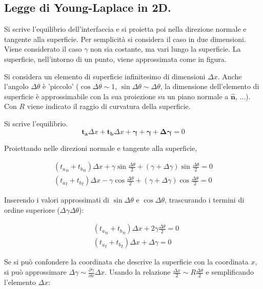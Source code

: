\subsection{Legge di Young-Laplace in 2D.}
 Si scrive l'equilibrio
 dell'interfaccia e si proietta poi nella direzione normale e tangente alla superficie.
Per semplicità si considera il caso in due dimensioni. Viene considerato il caso $\gamma$
non sia costante, ma vari lungo la superficie. La superficie, nell'intorno di un punto,
 viene approssimata come in figura.

Si considera un elemento di superficie infinitesimo di dimensioni $\Delta x$. Anche 
l'angolo $\Delta \theta$ è 'piccolo' ($\cos \Delta \theta \sim 1$, $\sin \Delta\theta \sim 
\Delta\theta$, la dimensione dell'elemento di superficie è approssimabile con la sua proiezione su 
un piano normale a $\bm{\hat{n}}$, ...). Con $R$ viene indicato il raggio di curvatura della
superficie.

Si scrive l'equilibrio.
\begin{equation}
  \bm{t_a} \Delta x + \bm{t_b} \Delta x + \bm{\gamma} + \bm{\gamma + \Delta \gamma} = 0
\end{equation}

Proiettando nelle direzioni normale e tangente alla superficie, 

\begin{equation}
 \begin{aligned}
  ( {t_a}_n + {t_b}_n )\Delta x + \gamma \sin \frac{\Delta\theta}{2}
      + (\gamma + \Delta \gamma) \sin \frac{\Delta\theta}{2} = 0 \\
  ( {t_a}_t + {t_b}_t )\Delta x - \gamma \cos \frac{\Delta\theta}{2}
      + (\gamma + \Delta \gamma) \cos\frac{\Delta \theta}{2} = 0
 \end{aligned}
\end{equation}

Inserendo i valori approssimati di $\sin \Delta \theta$ e $\cos \Delta \theta$, trascurando i termini di ordine superiore ($\Delta \gamma \Delta \theta$):

\begin{equation}
 \begin{aligned}
  & ( {t_a}_n + {t_b}_n )\Delta x + 2 \gamma \frac{\Delta \theta}{2} = 0 \\
  & ( {t_a}_t + {t_b}_t )\Delta x + \Delta \gamma = 0
 \end{aligned}
\end{equation}

Se si può confondere la coordinata che descrive la superficie con la coordinata $x$, si può 
approssimare $\Delta \gamma \sim \frac{\partial \gamma}{\partial x} \Delta x$.
Usando la relazione $\frac{\Delta x}{2} \sim R \frac{\Delta \theta}{2}$ e semplificando 
l'elemento $\Delta x$:

